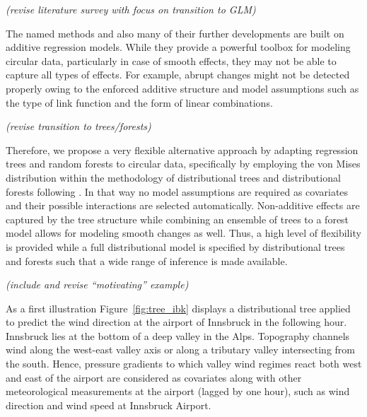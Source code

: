 \documentclass[nojss]{jss}
\newcommand{\fixme}[1]{\emph{\marginpar{FIXME} (#1)}}
\numberwithin{equation}{section}
\begin{document}
\fixme{revise literature survey with focus on transition to GLM}

The named methods and also many of their further developments 
\citep[see, e.g.,][]{Jammalamadaka+Sengupta:2001} are built on additive regression models.
While they provide a powerful toolbox for modeling circular data, particularly in case of
smooth effects, they may not be able to capture all types of effects. For example, abrupt changes 
might not be detected properly owing to the enforced additive structure and model assumptions 
such as the type of link function and the form of linear combinations.

\fixme{revise transition to trees/forests}

Therefore, we propose a very flexible alternative approach by adapting regression trees and random 
forests to circular data, specifically by employing the von Mises distribution within the methodology
of distributional trees and distributional forests following \cite{Schlosser+Hothorn+Stauffer:2019}. 
In that way no model assumptions are required as covariates and their possible interactions are
selected automatically. Non-additive effects are captured by the tree structure while combining an 
ensemble of trees to a forest model allows for modeling smooth changes as well. 
Thus, a high level of flexibility is provided while a full distributional model is specified 
by distributional trees and forests such that a wide range of inference is made available.

\fixme{include and revise ``motivating'' example}

As a first illustration Figure~\ref{fig:tree_ibk} displays a distributional
tree applied to predict the wind direction at the airport of Innsbruck in the following hour. 
Innsbruck lies at the bottom of a deep valley in the Alps. Topography channels wind along the 
west-east valley axis or along a tributary valley intersecting from the south. Hence, pressure 
gradients to which valley wind regimes react both west and east of the airport are considered 
as covariates along with other meteorological measurements at the airport (lagged by one hour),
such as wind direction and wind speed at Innsbruck Airport.
\end{document}
